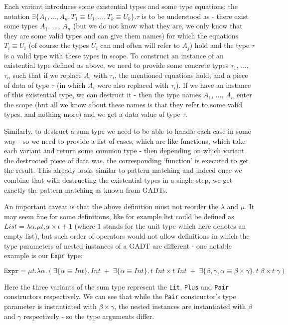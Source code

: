 Each variant introduces some existential types and some type equations: the notation $\exists \{A_1, ..., A_n, T_1 \equiv U_1, ..., T_k \equiv U_k \}. \tau$ is to be understood as - there exist some types $A_1$, ..., $A_n$ (but we do not know what they are, we only know that they are some valid types and can give them names) for which the equations $T_i \equiv U_i$ (of course the types $U_i$ can and often will refer to $A_j$) hold and the type $\tau$ is a valid type with these types in scope. 
To construct an instance of an existential type defined as above, we need to provide some concrete types $\tau_1$, ..., $\tau_n$ such that if we replace $A_i$ with $\tau_i$, the mentioned equations hold, and a piece of data of type $\tau$ (in which $A_i$ were also replaced with $\tau_i$). 
If we have an instance of this existential type, we can destruct it - then the type names $A_1$, ..., $A_n$ enter the scope (but all we know about these names is that they refer to some valid types, and nothing more) and we get a data value of type $\tau$.

Similarly, to destruct a sum type we need to be able to handle each case in some way - so we need to provide a list of cases, which are like functions, which take each variant and return some common type - then depending on which variant the destructed piece of data was, the corresponding `function' is executed to get the result. This already looks similar to pattern matching and indeed once we combine that with destructing the existential types in a single step, we get exactly the pattern matching as known from GADTs.

An important caveat is that the above definition must not reorder the $\lambda$ and $\mu$. It may seem fine for some definitions, like for example list could be defined as $List = \lambda \alpha. \mu t. \alpha \times t + 1$ (where $1$ stands for the unit type which here denotes an empty list), but such order of operators would not allow definitions in which the type parameters of nested instances of a GADT are different - one notable example is our \texttt{Expr} type:

\[
\texttt{Expr} = \mu t. \lambda \alpha. \left(
\exists \{ \alpha \equiv Int \}. \, Int
\; + \;
\exists \{ \alpha \equiv Int \}. \, t \; Int \times t \; Int
\; + \;
\exists \{ \beta, \gamma, \alpha \equiv \beta \times \gamma \}. \, t \; \beta \times t \; \gamma
\right)
\]

Here the three variants of the sum type represent the \texttt{Lit}, \texttt{Plus} and \texttt{Pair} constructors respectively. We can see that while the \texttt{Pair} constructor's type parameter is instantiated with $\beta \times \gamma$, the nested instances are instantiated with $\beta$ and $\gamma$ respectively - so the type arguments differ.

